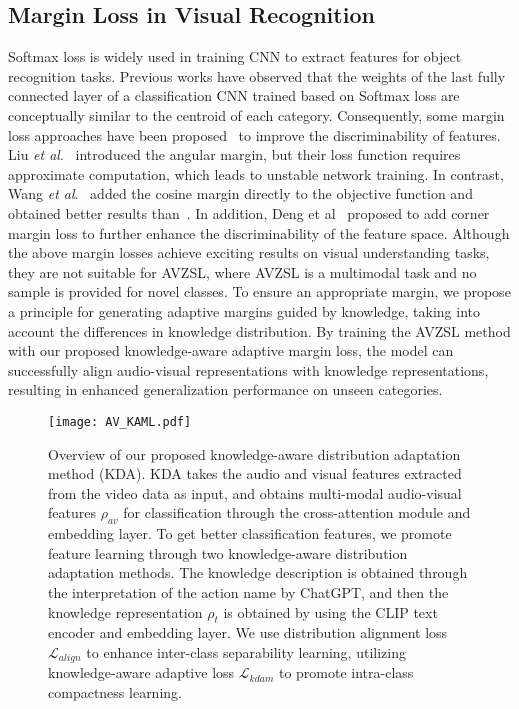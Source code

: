 \documentclass[10pt,twocolumn,letterpaper]{article}
\begin{document}
\subsection{Margin Loss in Visual Recognition}
Softmax loss is widely used in training CNN to extract features for object recognition tasks. 
Previous works have observed that the weights of the last fully connected layer of a classification CNN trained based on Softmax loss are conceptually similar to the centroid of each category. 
Consequently, some margin loss approaches have been proposed~\cite{Arcface,SphereFace,CosFace} to improve the discriminability of features. 
Liu \textit{et al}.~\cite{SphereFace} introduced the angular margin, but their loss function requires approximate computation, which leads to unstable network training. 
In contrast, Wang \textit{et al}.~\cite{CosFace} added the cosine margin directly to the objective function and obtained better results than~\cite{SphereFace}. In addition, Deng et al~\cite{Arcface} proposed to add corner margin loss to further enhance the discriminability of the feature space.
Although the above margin losses achieve exciting results on visual understanding tasks, they are not suitable for AVZSL, where AVZSL is a multimodal task and no sample is provided for novel classes.
To ensure an appropriate margin, we propose a principle for generating adaptive margins guided by knowledge, taking into account the differences in knowledge distribution.
By training the AVZSL method with our proposed knowledge-aware adaptive margin loss, the model can successfully align audio-visual representations with knowledge representations, resulting in enhanced generalization performance on unseen categories.

\begin{figure*}[t]
	\centering	\texttt{[image: AV\_KAML.pdf]}
	\caption{Overview of our proposed knowledge-aware distribution adaptation method (KDA). KDA takes the audio and visual features extracted from the video data as input, and obtains multi-modal audio-visual features $\rho_{av}$ for classification through the cross-attention module and embedding layer. To get better classification features, we promote feature learning through two knowledge-aware distribution adaptation methods. The knowledge description is obtained through the interpretation of the action name by ChatGPT, and then the knowledge representation $\rho_t$ is obtained by using the CLIP text encoder and embedding layer. We use distribution alignment loss $\mathcal{L}_{align}$ to enhance inter-class separability learning, utilizing knowledge-aware adaptive loss $\mathcal{L}_{kdam}$ to promote intra-class compactness learning.
}
	\label{KAML}
\end{figure*}
\end{document}
